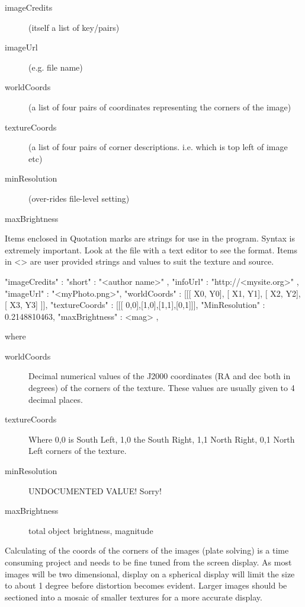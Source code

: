 \begin{description}
  \begin{description}
  \item[imageCredits] (itself a list of key/pairs)
  \item[imageUrl] (e.g. file name)
  \item[worldCoords] (a list of four pairs of coordinates representing the corners of the image)
  \item[textureCoords] (a list of four pairs of corner descriptions. i.e. which is top left of image etc)
  \item[minResolution] (over-rides file-level setting)
  \item[maxBrightness]
  \end{description}
\end{description}

Items enclosed in Quotation marks are strings for use in the program.
Syntax is extremely important. Look at the file with a text editor to
see the format. Items in \textless{}\textgreater{} are user provided
strings and values to suit the texture and source.

\begin{configfileScr}
{
  "imageCredits"  : { "short" : "<author name>" , 
                      "infoUrl" : "http://<mysite.org>" 
                    }, 
  "imageUrl"      : "<myPhoto.png>",
  "worldCoords"   : [[[ X0, Y0], [ X1, Y1], [ X2, Y2], [ X3, Y3] ]], 
  "textureCoords" : [[[ 0,0],[1,0],[1,1],[0,1]]], 
  "MinResolution" : 0.2148810463,
  "maxBrightness" : <mag>
},
\end{configfileScr}

where 

\begin{description}
\item[worldCoords] Decimal numerical values of the J2000 coordinates (RA and dec both in degrees) of the corners of the texture. These values are usually given to 4 decimal places.
\item[textureCoords]  Where 0,0 is South Left, 1,0 the South Right, 1,1 North Right, 0,1 North Left corners of the texture.
\item[minResolution] UNDOCUMENTED VALUE! Sorry!%
\item[maxBrightness] total object brightness, magnitude 
\end{description}


Calculating of the coords of the corners of the images (plate solving) is
a time consuming project and needs to be fine tuned from the screen
display. As most images will be two dimensional, display on a spherical
display will limit the size to about 1 degree before distortion becomes
evident. Larger images should be sectioned into a mosaic of smaller
textures for a more accurate display.


